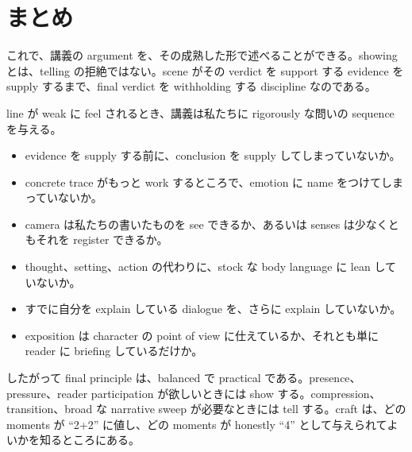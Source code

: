 \section{まとめ}

これで、講義の argument を、その成熟した形で述べることができる。showing とは、telling の拒絶ではない。scene がその verdict を support する evidence を supply するまで、final verdict を withholding する discipline なのである。

line が weak に feel されるとき、講義は私たちに rigorously な問いの sequence を与える。
\begin{itemize}
\item evidence を supply する前に、conclusion を supply してしまっていないか。
\item concrete trace がもっと work するところで、emotion に name をつけてしまっていないか。
\item camera は私たちの書いたものを see できるか、あるいは senses は少なくともそれを register できるか。
\item thought、setting、action の代わりに、stock な body language に lean していないか。
\item すでに自分を explain している dialogue を、さらに explain していないか。
\item exposition は character の point of view に仕えているか、それとも単に reader に briefing しているだけか。
\end{itemize}

したがって final principle は、balanced で practical である。presence、pressure、reader participation が欲しいときには show する。compression、transition、broad な narrative sweep が必要なときには tell する。craft は、どの moments が ``2+2'' に値し、どの moments が honestly ``4'' として与えられてよいかを知るところにある。